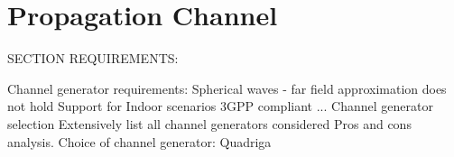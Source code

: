 \section{Propagation Channel}
\label{sec:radio_channel}



SECTION REQUIREMENTS:

Channel generator requirements:
    Spherical waves - far field approximation does not hold
    Support for Indoor scenarios
    3GPP compliant
    ...
Channel generator selection
    Extensively list all channel generators considered
    Pros and cons analysis.
    Choice of channel generator: Quadriga


